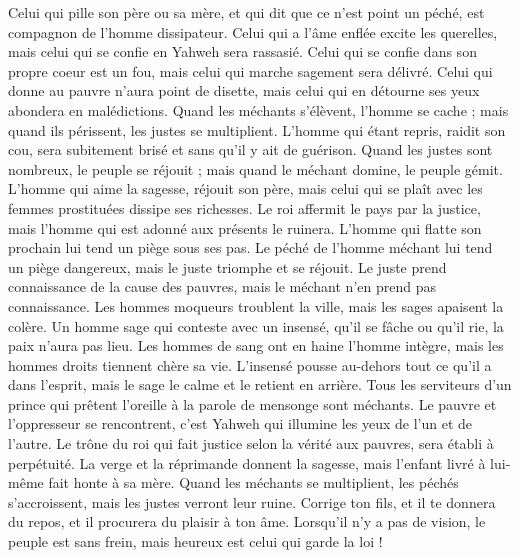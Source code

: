 \begin{multicols}{2}
Celui qui pille son père ou sa mère, et qui dit que ce n'est point un péché, est compagnon de l'homme dissipateur.
Celui qui a l'âme enflée excite les querelles, mais celui qui se confie en Yahweh sera rassasié.
Celui qui se confie dans son propre coeur est un fou, mais celui qui marche sagement sera délivré.
Celui qui donne au pauvre n'aura point de disette, mais celui qui en détourne ses yeux abondera en malédictions.
Quand les méchants s'élèvent, l'homme se cache ; mais quand ils périssent, les justes se multiplient.
\VerseOne{}L'homme qui étant repris, raidit son cou, sera subitement brisé et sans qu'il y ait de guérison.
Quand les justes sont nombreux, le peuple se réjouit ; mais quand le méchant domine, le peuple gémit.
L'homme qui aime la sagesse, réjouit son père, mais celui qui se plaît avec les femmes prostituées dissipe ses richesses.
Le roi affermit le pays par la justice, mais l'homme qui est adonné aux présents le ruinera.
L'homme qui flatte son prochain lui tend un piège sous ses pas.
Le péché de l'homme méchant lui tend un piège dangereux, mais le juste triomphe et se réjouit.
Le juste prend connaissance de la cause des pauvres, mais le méchant n'en prend pas connaissance.
Les hommes moqueurs troublent la ville, mais les sages apaisent la colère.
Un homme sage qui conteste avec un insensé, qu'il se fâche ou qu'il rie, la paix n'aura pas lieu.
Les hommes de sang ont en haine l'homme intègre, mais les hommes droits tiennent chère sa vie.
L'insensé pousse au-dehors tout ce qu'il a dans l'esprit, mais le sage le calme et le retient en arrière.
Tous les serviteurs d'un prince qui prêtent l'oreille à la parole de mensonge sont méchants.
Le pauvre et l'oppresseur se rencontrent, c'est Yahweh qui illumine les yeux de l'un et de l'autre.
Le trône du roi qui fait justice selon la vérité aux pauvres, sera établi à perpétuité.
La verge et la réprimande donnent la sagesse, mais l'enfant livré à lui-même fait honte à sa mère.
Quand les méchants se multiplient, les péchés s'accroissent, mais les justes verront leur ruine.
Corrige ton fils, et il te donnera du repos, et il procurera du plaisir à ton âme.
Lorsqu'il n'y a pas de vision, le peuple est sans frein, mais heureux est celui qui garde la loi !

\end{multicols}
